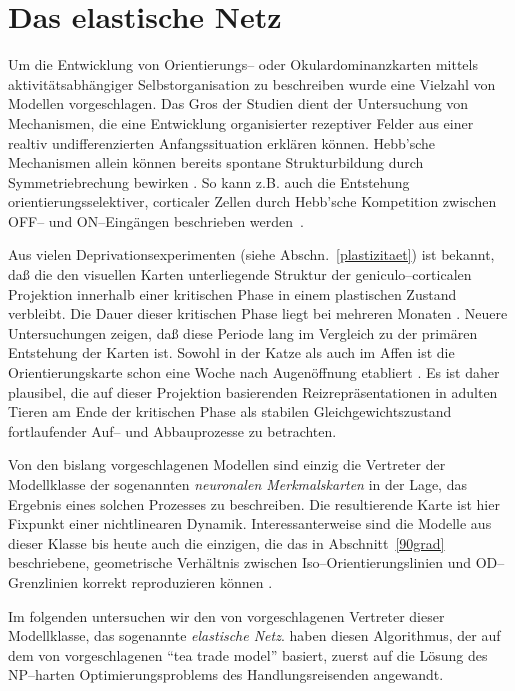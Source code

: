 \section{Das elastische Netz}
\label{modell}
\thispagestyle{plain}

Um die Entwicklung von Orientierungs-- oder Okulardominanzkarten mittels
aktivitätsabhängiger Selbstorganisation zu beschreiben wurde eine
Vielzahl von Modellen vorgeschlagen.  Das Gros der Studien dient der
Untersuchung von Mechanismen, die eine Entwicklung organisierter rezeptiver
Felder aus einer realtiv undifferenzierten Anfangssituation erklären
können. Hebb'sche Mechanismen allein können bereits spontane
Strukturbildung durch Symmetriebrechung bewirken \cite{linsker:1986}.  So
kann z.B. auch die Entstehung orientierungsselektiver, corticaler Zellen
durch Hebb'sche Kompetition zwischen OFF-- und ON--Eingängen beschrieben
werden~\cite{miller:1994}.

Aus vielen Deprivationsexperimenten (siehe Abschn.~\ref{plastizitaet}) ist
bekannt, daß die den visuellen Karten unterliegende Struktur der
geniculo--corticalen Projektion innerhalb einer kritischen Phase in einem
plastischen Zustand verbleibt.  Die Dauer dieser kritischen Phase liegt bei
mehreren Monaten \cite{hubel:1970}.  Neuere Untersuchungen zeigen, daß
diese Periode lang im Vergleich zu der primären Entstehung der Karten
ist. Sowohl in der Katze als auch im Affen ist die Orientierungskarte schon
eine Woche nach Augenöffnung etabliert
\cite{bonhoeffer:1995,blasdel:1995}.  Es ist daher plausibel, die auf
dieser Projektion basierenden Reizrepräsentationen in adulten Tieren am
Ende der kritischen Phase als stabilen Gleichgewichtszustand fortlaufender
Auf-- und Abbauprozesse zu betrachten.

Von den bislang vorgeschlagenen Modellen sind einzig die Vertreter der
Modellklasse der sogenannten \emph{neuronalen Merkmalskarten} in der Lage,
das Ergebnis eines solchen Prozesses zu beschreiben. Die resultierende
Karte ist hier Fixpunkt einer nichtlinearen Dynamik.  Interessanterweise
sind die Modelle aus dieser Klasse bis heute auch die einzigen, die das in
Abschnitt~\ref{90grad} beschriebene, geometrische Verhältnis zwischen
Iso--Orientierungslinien und OD--Grenzlinien korrekt reproduzieren können
\parencite[vgl. Abb.~\ref{odop_hist},links und ][]{erwin:1995}.

Im folgenden untersuchen wir den von \textcite{durbin:1991}
vorgeschlagenen Vertreter dieser Modellklasse, das sogenannte
\emph{elastische Netz}. \textcite{durbin:1987} haben diesen Algorithmus,
der auf dem von \textcite{marlsburg:1976} vorgeschlagenen ``tea
trade model'' basiert, zuerst auf die Lösung des
NP--harten Optimierungsproblems des Handlungsreisenden angewandt.

